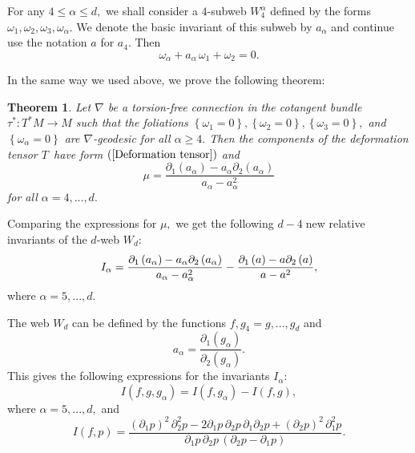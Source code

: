 \documentclass{article}
\newtheorem{theorem}{Theorem}
\begin{document}
For any $4\leq \alpha \leq d,$ we shall consider a $4$-subweb $W_{4}^{\alpha
}$ defined by the forms $\omega _{1},\omega _{2},\omega _{3},\omega _{\alpha
}.$ We denote the basic invariant of this subweb by $a_{\alpha }$ and
continue use the notation $a$ for $a_{4}$. Then
\begin{equation*}
\omega _{\alpha }+a_{\alpha }\,\omega _{1}+\omega _{2}=0.
\end{equation*}

In the same way we used above, we prove the following theorem:

\begin{theorem}
Let $\nabla $ be a torsion-free connection in the cotangent bundle $\tau
^{\ast }:T^{\ast }M\rightarrow M$ such that the foliations $\left\{ \omega
_{1}=0\right\} ,\left\{ \omega _{2}=0\right\} ,\left\{ \omega _{3}=0\right\}
,$ and $\left\{ \omega _{\alpha }=0\right\} $ are $\nabla $-geodesic for all
$\alpha \geq 4.$ Then the components of the deformation tensor $T$\ have
form $(\ref{Deformation tensor})$ and
\begin{equation}
\mu =\frac{\partial _{1}\left( a_{\alpha }\right) -a_{\alpha }\partial
_{2}\left( a_{\alpha }\right) }{a_{\alpha }-a_{\alpha }^{2}}
\label{mu-alpha relation}
\end{equation}
for all $\alpha =4,...,d.$
\end{theorem}

Comparing the expressions for $\mu ,$ we get the following $d-4\;$new
relative invariants of the $d$-web $W_{d}:$
\begin{equation*}
I_{\alpha }=\frac{\partial _{1}\left( a_{\alpha }\right) -a_{\alpha
}\partial _{2}\left( a_{\alpha }\right) }{a_{\alpha }-a_{\alpha }^{2}}-\frac{%
\partial _{1}\left( a\right) -a\partial _{2}\left( a\right) }{a-a^{2}},
\end{equation*}
where $\alpha =5,...,d.$

The web $W_{d}$ can be defined by the functions $f,g_{4}=g,...,g_{d}$ and
\begin{equation*}
a_{\alpha }=\frac{\partial _{1}\left( g_{\alpha }\right) }{\partial
_{2}\left( g_{\alpha }\right) }.
\end{equation*}%
This gives the following expressions for the invariants $I_{\alpha }:$%
\begin{equation*}
I(f,g,g_{\alpha })=I\left( f,g_{\alpha }\right) -I\left( f,g\right) ,
\end{equation*}%
where $\alpha =5,...,d,$ and
\begin{equation*}
I\left( f,p\right) =\frac{(\partial _{1}p)^{2}\,\partial _{2}^{2}p-2\partial
_{1}p\,\partial _{2}p\,\partial _{1}\partial _{2}p+(\partial
_{2}p)^{2}\,\partial _{1}^{2}p}{\partial _{1}p\,\partial _{2}p\,\left(
\partial _{2}p-\partial _{1}p\right) }.
\end{equation*}
\end{document}
